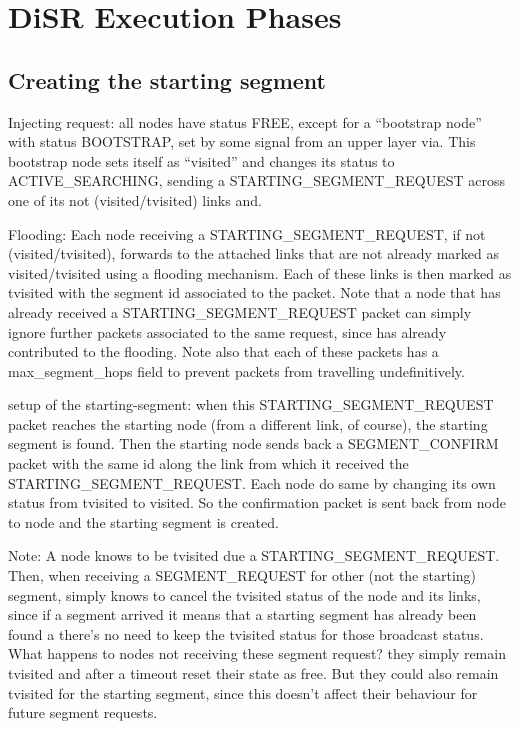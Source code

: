 \documentclass[conference]{IEEEtran}
\begin{document}
\section{DiSR Execution Phases}

\subsection{Creating the starting segment}

Injecting request: all nodes have status FREE, except for a
“bootstrap node” with status BOOTSTRAP, set by some signal from an
upper layer via. This bootstrap node sets itself as “visited” and
changes its status to ACTIVE\_SEARCHING, sending a
STARTING\_SEGMENT\_REQUEST across one of its not (visited/tvisited)
links and.  

Flooding: Each node receiving a STARTING\_SEGMENT\_REQUEST,
if not (visited/tvisited),  forwards  to the attached links that are
not already marked as visited/tvisited using a flooding mechanism.
Each of these links is then marked as tvisited with the segment id
associated to the packet. Note that a node that has already received a
STARTING\_SEGMENT\_REQUEST packet can simply ignore further packets
associated to the same request, since has already contributed to the
flooding. Note also that each of these packets has a max\_segment\_hops
field to prevent packets from travelling undefinitively.  

setup of the starting-segment: when this STARTING\_SEGMENT\_REQUEST packet reaches
the starting node (from a different link, of course), the starting
segment is found. Then the starting node sends back a SEGMENT\_CONFIRM
packet with the same id along the link from which it received the
STARTING\_SEGMENT\_REQUEST. Each node do same by changing its own status
from tvisited to visited. So the confirmation packet is sent back from
node to node and the starting segment is created. 

Note: A node knows to be tvisited due a  STARTING\_SEGMENT\_REQUEST.
Then, when receiving a SEGMENT\_REQUEST for other (not the starting)
segment, simply knows to cancel the tvisited status of the node and
its links, since if a segment arrived it means that a starting segment
has already been found a there’s no need to keep the tvisited status
for those broadcast status. What happens to nodes not receiving these
segment request? they simply remain tvisited and after a timeout reset
their state as free. But they could also remain tvisited for the
starting segment, since this doesn’t affect their behaviour for future
segment requests.  
\end{document}

